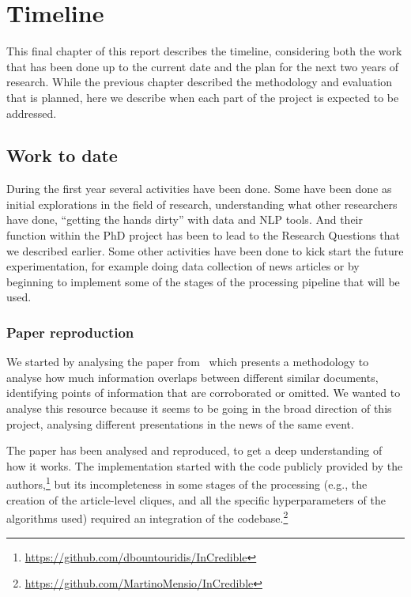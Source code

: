 \chapter{Timeline}
\label{chap:plan}

This final chapter of this report describes the timeline, considering both the work that has been done up to the current date and the plan for the next two years of research.
While the previous chapter described the methodology and evaluation that is planned, here we describe when each part of the project is expected to be addressed.

\section{Work to date}

During the first year several activities have been done.
Some have been done as initial explorations in the field of research, understanding what other researchers have done, ``getting the hands dirty'' with data and NLP tools.
And their function within the PhD project has been to lead to the Research Questions that we described earlier.
Some other activities have been done to kick start the future experimentation, for example doing data collection of news articles or by beginning to implement some of the stages of the processing pipeline that will be used.


\subsection{Paper reproduction~\cite{bountouridis2018explaining}}
We started by analysing the paper from~\citet{bountouridis2018explaining} which presents a methodology to analyse how much information overlaps between different similar documents, identifying points of information that are corroborated or omitted.
We wanted to analyse this resource because it seems to be going in the broad direction of this project, analysing different presentations in the news of the same event.

The paper has been analysed and reproduced, to get a deep understanding of how it works. The implementation started with the code publicly provided by the authors,\footnote{\url{https://github.com/dbountouridis/InCredible}} but its incompleteness in some stages of the processing (e.g., the creation of the article-level cliques, and all the specific hyperparameters of the algorithms used) required an integration of the codebase.\footnote{\url{https://github.com/MartinoMensio/InCredible}}

